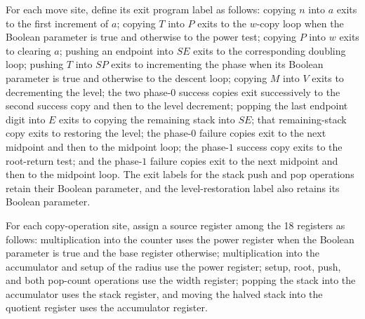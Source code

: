 \begin{definition}
\label{Complexity.LogProg.SavitchARM.mvExit}
\leanok
{}
For each move site, define its exit program label as follows: copying $n$ into $a$ exits
to the first increment of $a$; copying $T$ into $P$ exits to the $w$-copy loop when the
Boolean parameter is true and otherwise to the power test; copying $P$ into $w$ exits to
clearing $a$; pushing an endpoint into $SE$ exits to the corresponding doubling loop;
pushing $T$ into $SP$ exits to incrementing the phase when its Boolean parameter is true
and otherwise to the descent loop; copying $M$ into $V$ exits to decrementing the level;
the two phase-$0$ success copies exit successively to the second success copy and then
to the level decrement; popping the last endpoint digit into $E$ exits to copying the
remaining stack into $SE$; that remaining-stack copy exits to restoring the level; the
phase-$0$ failure copies exit to the next midpoint and then to the midpoint loop; the
phase-$1$ success copy exits to the root-return test; and the phase-$1$ failure copies
exit to the next midpoint and then to the midpoint loop. The exit labels for the stack
push and pop operations retain their Boolean parameter, and the level-restoration label
also retains its Boolean parameter.
\end{definition}

\begin{definition}
\label{Complexity.LogProg.SavitchARM.cpSrc}
\leanok
{}
For each copy-operation site, assign a source register among the 18 registers as
follows: multiplication into the counter uses the power register when the Boolean
parameter is true and the base register otherwise; multiplication into the accumulator
and setup of the radius use the power register; setup, root, push, and both pop-count
operations use the width register; popping the stack into the accumulator uses the stack
register, and moving the halved stack into the quotient register uses the accumulator
register.
\end{definition}

